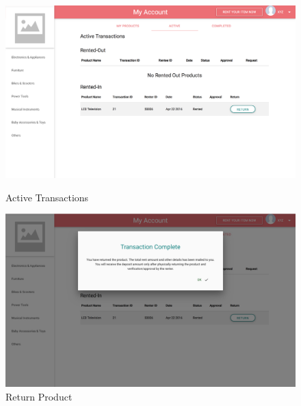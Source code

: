 \documentclass[11pt]{report}
\begin{document}
    \begin{figure}[h]
  \centering
    \includegraphics[width=6in]{active.png} 
	\caption{Active Transactions}
\vspace{0.5in}
  \centering
    \includegraphics[width=6in]{return.png} 
	\caption{Return Product}
	\end{figure}
\end{document}

